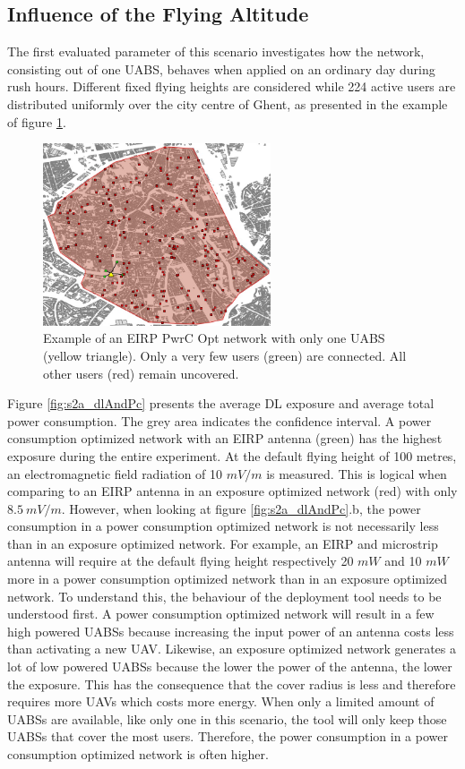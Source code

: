 \subsection{Influence of the Flying Altitude}
The first evaluated parameter of this scenario investigates how the network, consisting out of one \acs{UABS}, behaves when applied on an ordinary day during rush hours. 
Different fixed flying heights are considered while 224 active users are distributed uniformly over the city centre of Ghent, 
as presented in the example of figure \ref{fig:s2a:distribution}.
\begin{figure}[h]
  \centering
  \includegraphics[width=0.6\textwidth]{../images/ghentDistribution_pcEIRP_1drone.jpg}
  \caption{Example of an EIRP \gls{PwrC Opt} network with only one \acs{UABS} (yellow triangle). Only a very few users (green) are connected.
  All other users (red) remain uncovered.}
  \label{fig:s2a:distribution}
\end{figure}

Figure \ref{fig:s2a_dlAndPc} presents the average \gls{DL} exposure and average total power consumption. The grey area indicates the confidence interval. 
A power consumption optimized network with an \gls{EIRP} antenna (green) has the highest exposure during the 
entire experiment. At the default flying height of 100 metres, an electromagnetic field radiation 
of 10 $mV/m$ is measured.
This is logical when comparing to an EIRP antenna in an exposure optimized network (red) with only $8.5\ mV/m$. 
However, when looking at figure \ref{fig:s2a_dlAndPc}.b, the power consumption in a power consumption optimized network is not necessarily less 
than in an exposure optimized network. 
For example, an \gls{EIRP} and microstrip antenna will require at the default flying height respectively
20 $mW$ and 10 $mW$ more in a power consumption optimized network than in an exposure optimized network.
To understand this, the behaviour of the deployment tool needs to be understood first. 
A power consumption optimized network will result in a few high powered \gls{UABS}s because increasing the input power of an antenna costs 
less than activating a new  \gls{UAV}. Likewise, an exposure optimized network 
generates a lot of low powered \gls{UABS}s because the lower the power of the antenna, the lower the exposure. This has the consequence that the cover radius 
is less and therefore requires more \gls{UAV}s which costs more energy.
When only a limited amount of \gls{UABS}s are available, 
like only one in this scenario, the tool will only keep those \gls{UABS}s that cover the most users. 
Therefore, the power consumption in a power consumption optimized network is often higher. 

